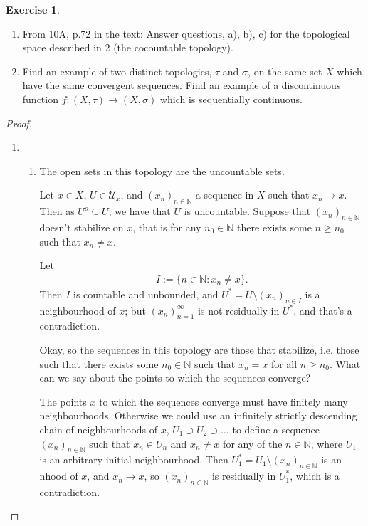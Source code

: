 \documentclass[12pt]{extarticle}
\newcommand{\set}[1]{\{#1\}}
\newcommand{\N}{\mathbb{N}}
\newcommand{\<}{\langle}
\renewcommand{\>}{\rangle}
\theoremstyle{definition}
\newtheorem{exercise}{Exercise}
\begin{document}
\begin{exercise}
  \begin{enumerate}
  \item
    From 10A, p.72 in the text: Answer questions, a), b), c) for the topological space described in 2 (the cocountable topology).
  \item
    Find an example of two distinct topologies, $\tau$ and $\sigma$, on the same set $X$ which have the same convergent sequences. Find an example of a discontinuous function $f:(X, \tau) \to (X, \sigma)$ which is sequentially continuous. 
  \end{enumerate}
\end{exercise}
\begin{proof}
  \begin{enumerate}
  \item
    \begin{enumerate}
    \item
      The open sets in this topology are the uncountable sets.

      Let $x \in X$, $U \in \mathcal{U}_x$, and $(x_n)_{n \in \N}$ a sequence in $X$ such that $x_n \to x$.
      Then as $U^o \subseteq U$, we have that $U$ is uncountable. Suppose that $(x_n)_{n \in \N}$ doesn't stabilize on $x$,
      that is for any $n_0 \in \N$ there exists some $n \geq n_0$ such that $x_n \neq x$.

      Let
      \begin{align*}
        I := \set{n \in \N: x_n \neq x}.
      \end{align*}
      Then $I$ is countable and unbounded, and $U^* = U \setminus (x_n)_{n \in I}$ is a neighbourhood of $x$; but $(x_n)_{n=1}^{\infty}$
      is not residually in $U^*$, and that's a contradiction.

      Okay, so the sequences in this topology are those that stabilize, i.e. those such that there exists some $n_0 \in \N$ such that $x_n = x$ for all $n \geq n_0$. What can we say about the points to which the sequences converge?

      The points $x$ to which the sequences converge must have finitely many neighbourhoods. Otherwise we could use an infinitely strictly descending chain of neighbourhoods of $x$, $ U_1 \supset U_2 \supset \dots$
      to define a sequence $(x_n)_{n \in \N}$ such that $x_n \in U_n$ and $x_n \neq x$ for any of the $n \in \N$, where $U_1$ is an arbitrary initial neighbourhood.
      Then $U_1^{*} = U_1 \setminus (x_n)_{n \in \N}$ is an nhood of $x$, and $x_n \to x$, so  $(x_n)_{n \in \N}$ is residually in $U_1^{*}$, which is a contradiction. 



\end{enumerate}
\end{enumerate}
\end{proof}
\end{document}
